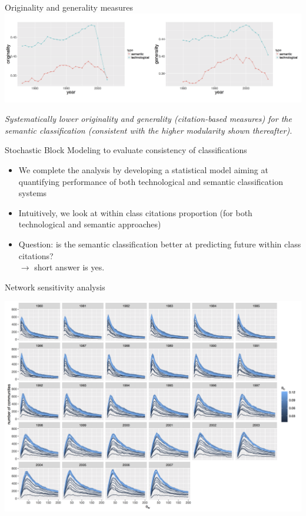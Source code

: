 \documentclass{beamer}
\begin{document}
\begin{frame}{Originality and generality measures}
    \centering
    \includegraphics[width=\textwidth]{figures/Fig6.png}
    
    \medskip
    
    \textit{Systematically lower originality and generality (citation-based measures) for the semantic classification (consistent with the higher modularity shown thereafter).}
    
\end{frame}

\begin{frame}{Stochastic Block Modeling to evaluate consistency of classifications}
\begin{itemize}
    \item   We complete the analysis by developing a statistical model aiming at quantifying performance of both technological and semantic classification systems
    \item Intuitively, we look at within class citations proportion (for both technological and semantic approaches)
    \item Question: is the semantic classification better at predicting future within class citations? \\
    $\longrightarrow$ short answer is \alert{yes}.
\end{itemize} 
\end{frame}




\begin{frame}{Network sensitivity analysis}
\label{slide:sensitivity}
\hyperlink{slide:relevance}{}

	\includegraphics[width=\textwidth]{figures/commnum_thetaw_byyears.png}
\end{frame}
\end{document}
